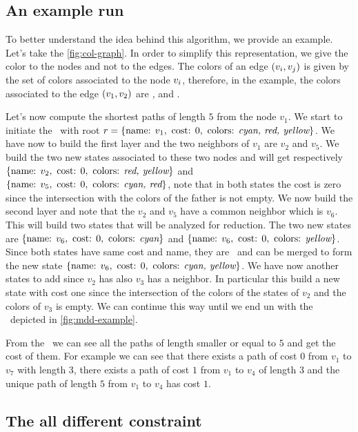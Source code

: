 \subsection{An example run}



To better understand the idea behind this algorithm, we provide an example. Let's take the \cref{fig:col-graph}.
In order to simplify this representation, we give the color to the nodes and not to the edges. The colors of an edge $(v_i, v_j)$ is given by the set of colors associated to the node $v_i$, therefore, in the example, the colors associated to the edge $(v_1, v_2)$ are \textit{\colA, \colB} and \textit{\colC}.

Let's now compute the shortest paths of length $5$ from the node $v_1$. We start to initiate the \mdd\ with root $r = \{\text{name: } v_1, \text{ cost: } 0, \text{ colors: } \textit{cyan, red, yellow} \}$. We have now to build the first layer and the two neighbors of $v_1$ are $v_2$ and $v_5$. We build the two new states associated to these two nodes and will get respectively $\{\text{name: } v_2, \text{ cost: } 0, \text{ colors: } \textit{red, yellow} \}$ and $\{\text{name: } v_5, \text{ cost: } 0, \text{ colors: } \textit{cyan, red} \}$, note that in both states the cost is zero since the intersection with the colors of the father is not empty. We now build the second layer and note that the $v_2$ and $v_5$ have a common neighbor which is $v_6$. This will build two states that will be analyzed for reduction. The two new states are $\{\text{name: } v_6, \text{ cost: } 0, \text{ colors: } \textit{cyan} \}$ and $\{\text{name: } v_6, \text{ cost: } 0, \text{ colors: } \textit{yellow} \}$. Since both states have same cost and name, they are \compatibleState\ and can be merged to form the new state $\{\text{name: } v_6, \text{ cost: } 0, \text{ colors: } \textit{cyan, yellow} \}$. We have now another states to add since $v_2$ has also $v_3$ has a neighbor. In particular this build a new state with cost one since the intersection of the colors of the states of $v_2$ and the colors of $v_3$ is empty. We can continue this way until we end un with the \mdd\ depicted in \cref{fig:mdd-example}.

From the \mdd\ we can see all the paths of length smaller or equal to $5$ and get the cost of them. For example we can see that there exists a path of cost $0$ from $v_1$ to $v_7$ with length $3$, there exists a path of cost $1$ from $v_1$ to $v_4$ of length $3$ and the unique path of length $5$ from $v_1$ to $v_4$ has cost $1$.

\subsection{The all different constraint}

